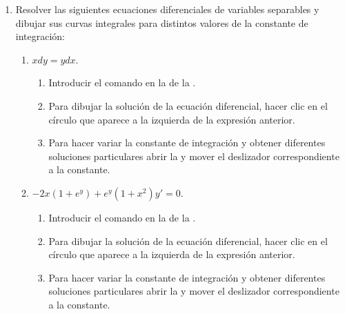 \begin{enumerate}[leftmargin=*]
\item Resolver las siguientes ecuaciones diferenciales de variables separables y dibujar sus curvas integrales para distintos valores de la constante de integración:
      \begin{enumerate}
      \item $xdy=ydx$.
            \begin{indication}
            \begin{enumerate}
            \item Introducir el comando  en la  de la .
            \item Para dibujar la solución de la ecuación diferencial, hacer clic en el círculo que aparece a la izquierda de la expresión anterior.
            \item Para hacer variar la constante de integración y obtener diferentes soluciones particulares abrir la  y mover el deslizador correspondiente a la constante.
            \end{enumerate}
            \end{indication}

      \item $-2x(1+e^y)+e^y(1+x^{2})y'=0$.
            \begin{indication}
            \begin{enumerate}
            \item Introducir el comando  en la  de la .
            \item Para dibujar la solución de la ecuación diferencial, hacer clic en el círculo que aparece a la izquierda de la expresión anterior.
            \item Para hacer variar la constante de integración y obtener diferentes soluciones particulares abrir la  y mover el deslizador correspondiente a la constante.
            \end{enumerate}
            \end{indication}


\end{enumerate}
\end{enumerate}
